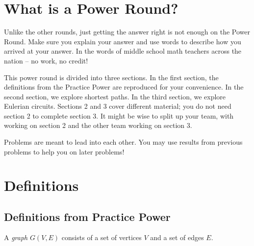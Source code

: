 \documentclass[11pt]{article}
\begin{document}
\section{What is a Power Round?}

Unlike the other rounds, just getting the answer right is not enough on the Power Round. Make sure you explain your answer and use words
to describe how you arrived at your answer. In the words of middle school math teachers across the nation -- no work, no credit!

This power round is divided into three sections. In the first section, the definitions from the Practice Power are reproduced for your convenience.
In the second section, we explore shortest paths. In the third section, we explore Eulerian circuits. Sections 2 and 3 cover different material;
you do not need section 2 to complete section 3. It might be wise to split up your team, with  working on section 2 and the other team working
on section 3.

Problems are meant to lead into each other. You may use results from previous problems to help you on later problems!

\section{Definitions}

\subsection{Definitions from Practice Power}

\begin{definition}
\label{def:graph}
A \textit{graph} $G(V,E)$ consists of a set of vertices $V$ and a set of edges $E$. 

\begin{center}
\end{center}
\end{definition}
\end{document}
